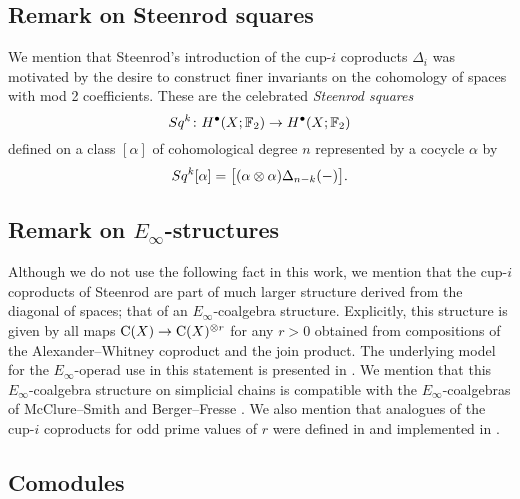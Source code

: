 \subsection{Remark on Steenrod squares} \label{ss:steenrod squares}

We mention that Steenrod's introduction of the cup-$i$ coproducts $\Delta_i$ was motivated by the desire to construct finer invariants on the cohomology of spaces with mod 2 coefficients.
These are the celebrated \textit{Steenrod squares}
\[
Sq^k \colon H^\bullet(X; {\mathbb{F}_2}) \to H^\bullet(X; {\mathbb{F}_2})
\]
defined on a class $[\alpha]$ of cohomological degree $n$ represented by a cocycle $\alpha$ by
\[
Sq^k [\alpha] = \big[ (\alpha \otimes \alpha) \Delta_{n-k}(-) \big].
\]

\subsection{Remark on $E_\infty$-structures}

Although we do not use the following fact in this work, we mention that the cup-$i$ coproducts of Steenrod are part of much larger structure derived from the diagonal of spaces; that of an $E_\infty$-coalgebra structure.
Explicitly, this structure is given by all maps $\operatorname{C}(X) \to \operatorname{C}(X)^{\otimes r}$ for any $r > 0$ obtained from compositions of the Alexander--Whitney coproduct and the join product.
The underlying model for the $E_\infty$-operad use in this statement is presented in \cite{medina2020prop1, medina2021prop2}.
We mention that this $E_\infty$-coalgebra structure on simplicial chains is compatible with the $E_\infty$-coalgebras of McClure--Smith \cite{mcclure2003multivariable} and Berger--Fresse \cite{berger2004combinatorial}.
We also mention that analogues of the cup-$i$ coproducts for odd prime values of $r$ were defined in \cite{medina2021may_st} and implemented in \cite{medina2021comch}.

\subsection{Comodules}

